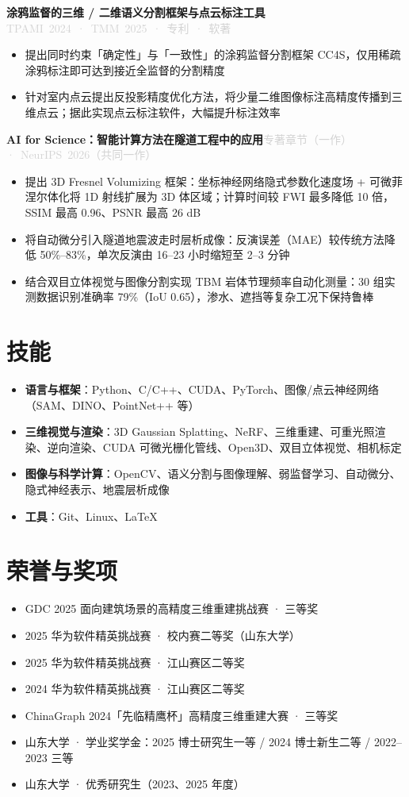 \documentclass[10pt, a4paper]{ctexart}
\newcommand{\taggray}[1]{\mbox{\textcolor{lightgray}{#1}}}
\begin{document}
\noindent\textbf{涂鸦监督的三维 / 二维语义分割框架与点云标注工具}\hfill \taggray{TPAMI 2024 · TMM 2025 · 专利 · 软著}
\begin{itemize}
  \item 提出同时约束「确定性」与「一致性」的涂鸦监督分割框架 CC4S，仅用稀疏涂鸦标注即可达到接近全监督的分割精度
  \item 针对室内点云提出反投影精度优化方法，将少量二维图像标注高精度传播到三维点云；据此实现点云标注软件，大幅提升标注效率
\end{itemize}

\noindent\textbf{AI for Science：智能计算方法在隧道工程中的应用}\hfill \taggray{专著章节（一作）· NeurIPS 2026（共同一作）}
\begin{itemize}
  \item 提出 3D Fresnel Volumizing 框架：坐标神经网络隐式参数化速度场 + 可微菲涅尔体化将 1D 射线扩展为 3D 体区域；计算时间较 FWI 最多降低 10 倍，SSIM 最高 0.96、PSNR 最高 26 dB
  \item 将自动微分引入隧道地震波走时层析成像：反演误差（MAE）较传统方法降低 50\%--83\%，单次反演由 16--23 小时缩短至 2--3 分钟
  \item 结合双目立体视觉与图像分割实现 TBM 岩体节理频率自动化测量：30 组实测数据识别准确率 79\%（IoU 0.65），渗水、遮挡等复杂工况下保持鲁棒
\end{itemize}

\section{技能}
\begin{itemize}
  \item \textbf{语言与框架}：Python、C/C++、CUDA、PyTorch、图像/点云神经网络（SAM、DINO、PointNet++ 等）
  \item \textbf{三维视觉与渲染}：3D Gaussian Splatting、NeRF、三维重建、可重光照渲染、逆向渲染、CUDA 可微光栅化管线、Open3D、双目立体视觉、相机标定
  \item \textbf{图像与科学计算}：OpenCV、语义分割与图像理解、弱监督学习、自动微分、隐式神经表示、地震层析成像
  \item \textbf{工具}：Git、Linux、\LaTeX
\end{itemize}

\section{荣誉与奖项}
\begin{itemize}
  \item GDC 2025 面向建筑场景的高精度三维重建挑战赛 · 三等奖
  \item 2025 华为软件精英挑战赛 · 校内赛二等奖（山东大学）
  \item 2025 华为软件精英挑战赛 · 江山赛区二等奖
  \item 2024 华为软件精英挑战赛 · 江山赛区二等奖
  \item ChinaGraph 2024「先临精鹰杯」高精度三维重建大赛 · 三等奖
  \item 山东大学 · 学业奖学金：2025 博士研究生一等 / 2024 博士新生二等 / 2022--2023 三等
  \item 山东大学 · 优秀研究生（2023、2025 年度）
\end{itemize}
\end{document}

